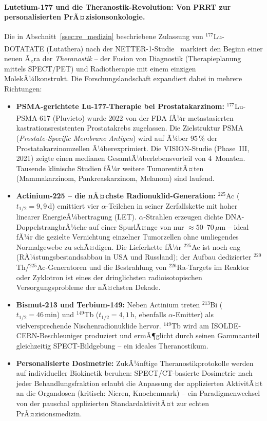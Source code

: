 ﻿\documentclass[12pt, a4paper]{report}
\theoremstyle{definition}
\theoremstyle{remark}
\begin{document}
\paragraph{Lutetium-177 und die Theranostik-Revolution: Von PRRT zur
personalisierten PrÃ¤zisionsonkologie.}
Die in Abschnitt~\ref{ssec:re_medizin} beschriebene Zulassung von
$^{177}$Lu-DOTATATE (Lutathera\textsuperscript{\textregistered}) nach der
NETTER-1-Studie~\cite{strosberg2017} markiert den Beginn einer neuen Ã„ra
der \emph{Theranostik} -- der Fusion von Diagnostik (Therapie\-planung mittels
SPECT/PET) und Radiotherapie mit einem einzigen MolekÃ¼lkonstrukt. Die
Forschungslandschaft expandiert dabei in mehrere Richtungen:

\begin{itemize}
  \item \textbf{PSMA-gerichtete Lu-177-Therapie bei Prostatakarzinom:}
    $^{177}$Lu-PSMA-617 (Pluvicto\textsuperscript{\textregistered}) wurde
    2022 von der FDA fÃ¼r metastasierten kastrationsresistenten Prostatakrebs
    zugelassen. Die Zielstruktur PSMA (\emph{Prostate-Specific Membrane
    Antigen}) wird auf Ã¼ber $95\,\%$ der Prostatakarzinomzellen Ã¼berexprimiert.
    Die VISION-Studie (Phase~III, 2021) zeigte einen medianen
    GesamtÃ¼berlebensvorteil von $4$~Monaten. Tausende klinische Studien fÃ¼r
    weitere TumorentitÃ¤ten (Mammakarzinom, Pankreaskarzinom, Melanom) sind
    laufend.

  \item \textbf{Actinium-225 -- die nÃ¤chste Radionuklid-Generation:}
    $^{225}$Ac ($t_{1/2} = 9{,}9\,\text{d}$) emittiert vier
    $\alpha$-Teilchen in seiner Zerfallskette mit hoher linearer
    EnergieÃ¼bertragung (LET). $\alpha$-Strahlen erzeugen dichte
    DNA-DoppelstrangbrÃ¼che auf einer SpurlÃ¤nge von nur $\approx
    50$--$70\,\mu\text{m}$ -- ideal fÃ¼r die gezielte Vernichtung einzelner
    Tumorzellen ohne umliegendes Normalgewebe zu schÃ¤digen. Die
    Lieferkette fÃ¼r $^{225}$Ac ist noch eng (RÃ¼stungsbestandsabbau in USA
    und Russland); der Aufbau dedizierter $^{229}$Th/$^{225}$Ac-Generatoren
    und die Bestrahlung von $^{226}$Ra-Targets im Reaktor oder Zyklotron ist
    eines der dringlichsten radioisotopischen Versorgungsprobleme der nÃ¤chsten
    Dekade.

  \item \textbf{Bismut-213 und Terbium-149:}
    Neben Actinium treten $^{213}$Bi ($t_{1/2} = 46\,\text{min}$) und
    $^{149}$Tb ($t_{1/2} = 4{,}1\,\text{h}$, ebenfalls $\alpha$-Emitter)
    als vielversprechende Nischenradionuklide hervor. $^{149}$Tb wird am
    ISOLDE-CERN-Beschleuniger produziert und ermÃ¶glicht durch seinen
    Gammaanteil gleichzeitig SPECT-Bildgebung -- ein ideales Theranostikum.

  \item \textbf{Personalisierte Dosimetrie:}
    ZukÃ¼nftige Theranostikprotokolle werden auf individueller Biokinetik
    beruhen: SPECT/CT-basierte Dosimetrie nach jeder Behandlungsfraktion
    erlaubt die Anpassung der applizierten AktivitÃ¤t an die Organdosen
    (kritisch: Nieren, Knochenmark) -- ein Paradigmenwechsel von der
    pauschal applizierten StandardaktivitÃ¤t zur echten PrÃ¤zisionsmedizin.
\end{itemize}
\end{document}
